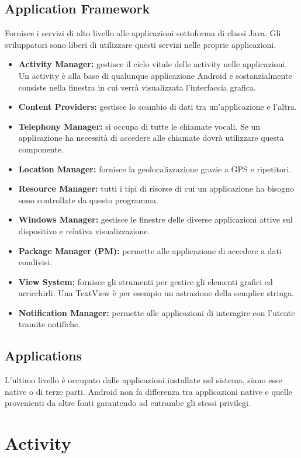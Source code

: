 \subsection{Application Framework}
Fornisce i servizi di alto livello alle applicazioni sottoforma di classi Java. Gli sviluppatori sono liberi di utilizzare questi servizi nelle proprie applicazioni.
\begin{itemize}
\item \textbf{Activity Manager:} gestisce il ciclo vitale delle activity nelle applicazioni. Un activity è alla base di qualunque applicazione Android e sostanzialmente consiste nella finestra in cui verrà visualizzata l'interfaccia grafica.
\item \textbf{Content Providers:} gestisce lo scambio di dati tra un'applicazione e l'altra.
\item \textbf{Telephony Manager:} si occupa di tutte le chiamate vocali. Se un applicazione ha necessità di accedere alle chiamate dovrà utilizzare questa componente.
\item \textbf{Location Manager:} fornisce la geolocalizzazione grazie a GPS e ripetitori.
\item \textbf{Resource Manager:} tutti i tipi di risorse di cui un applicazione ha bisogno sono controllate da questo programma.
\item \textbf{Windows Manager:} gestisce le finestre delle diverse applicazioni attive sul dispositivo e relativa visualizzazione.
\item \textbf{Package Manager (PM):} permette alle applicazione di accedere a dati condivisi.
\item \textbf{View System:} fornisce gli strumenti per gestire gli elementi grafici ed arricchirli. Una TextView è per esempio un astrazione della semplice stringa.
\item \textbf{Notification Manager:} permette alle applicazioni di interagire con l'utente tramite notifiche.
\end{itemize}

\subsection{Applications}
L'ultimo livello è occupato dalle applicazioni installate nel sistema, siano esse native o di terze parti. Android non fa differenza tra applicazioni native e quelle provenienti da altre fonti garantendo ad entrambe gli stessi privilegi.

\section{Activity}

